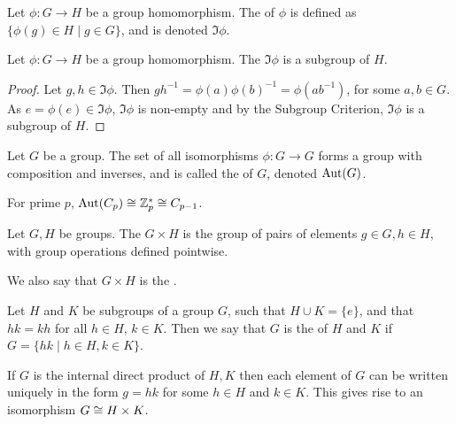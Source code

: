\begin{definition}
  Let \(\phi : G \to H\) be a group homomorphism.
  The  of \(\phi\) is defined as \(\{\phi(g) \in H \mid g \in G\}\), and is denoted \(\Im \phi\).
\end{definition}

\begin{lemma}
  Let \(\phi : G \to H\) be a group homomorphism.
  The \(\Im \phi\) is a subgroup of \(H\).
\end{lemma}

\begin{proof}
  Let \(g, h \in \Im \phi\).
  Then \(gh^{-1} = \phi(a)\phi(b)^{-1} = \phi(ab^{-1})\), for some \(a,b \in G\).
  As \(e = \phi(e) \in \Im \phi\), \(\Im \phi\) is non-empty and by the Subgroup Criterion, \(\Im \phi\) is a subgroup of \(H\).
\end{proof}

\begin{definition}
  \label{def:group-theory:automorphism-group}
  Let \(G\) be a group.
  The set of all isomorphisms \(\phi : G \to G\) forms a group with composition and inverses, and is called the  of \(G\), denoted \(\operatorname{Aut} (G)\).
\end{definition}

\begin{example}
  For prime \(p\), \(\operatorname{Aut}(C_{p}) \cong \mathbb{Z}^{*}_{p} \cong C_{p-1}\).
\end{example}

\begin{definition}
  Let \(G, H\) be groups.
  The  \(G \times H\) is the group of pairs of elements \(g \in G, h \in H\), with group operations defined pointwise.

  We also say that \(G \times H\) is the .
\end{definition}

\begin{definition}\label{def:group-theory:internal-direct-product}
  Let \(H\) and \(K\) be subgroups of a group \(G\), such that \(H \cup K = \{e\}\), and that \(hk=kh\) for all \(h \in H\), \(k \in K\). Then we say that \(G\) is the  of \(H\) and \(K\) if \(G = \{hk \mid h \in H, k \in K\}\).
\end{definition}

\begin{lemma}
  If \(G\) is the internal direct product of \(H, K\) then each element of \(G\) can be written uniquely in the form \(g = hk\) for some \(h \in H\) and \(k \in K\). This gives rise to an isomorphism \(G \cong H \times K\).
\end{lemma}

